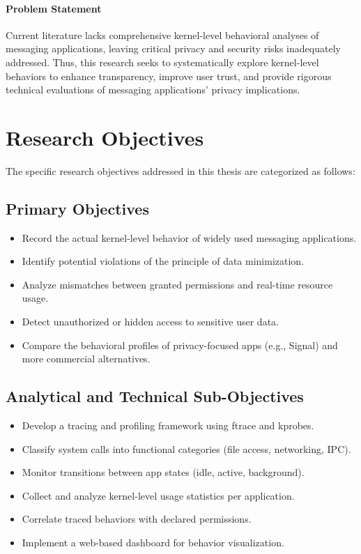 \documentclass[a4paper,12pt]{report}
\begin{document}
\paragraph{Problem Statement}
Current literature lacks comprehensive kernel-level behavioral analyses of messaging applications, leaving critical privacy and security risks inadequately addressed. Thus, this research seeks to systematically explore kernel-level behaviors to enhance transparency, improve user trust, and provide rigorous technical evaluations of messaging applications' privacy implications.

\section{Research Objectives}
The specific research objectives addressed in this thesis are categorized as follows:

\subsection*{Primary Objectives}
\begin{itemize}
\item Record the actual kernel-level behavior of widely used messaging applications.
\item Identify potential violations of the principle of data minimization.
\item Analyze mismatches between granted permissions and real-time resource usage.
\item Detect unauthorized or hidden access to sensitive user data.
\item Compare the behavioral profiles of privacy-focused apps (e.g., Signal) and more commercial alternatives.
\end{itemize}

\subsection*{Analytical and Technical Sub-Objectives}
\begin{itemize}
\item Develop a tracing and profiling framework using ftrace and kprobes.
\item Classify system calls into functional categories (file access, networking, IPC).
\item Monitor transitions between app states (idle, active, background).
\item Collect and analyze kernel-level usage statistics per application.
\item Correlate traced behaviors with declared permissions.
\item Implement a web-based dashboard for behavior visualization.
\end{itemize}
\end{document}
